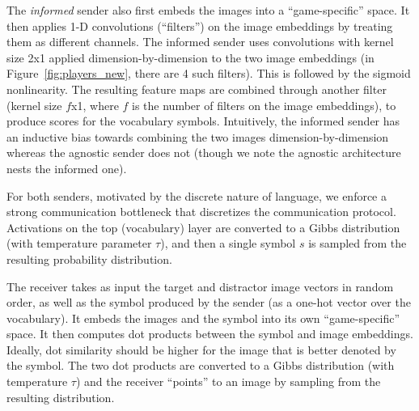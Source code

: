 The \emph{informed} sender also first embeds
the images into a ``game-specific'' space. It then applies 1-D
convolutions (``filters'') on the image embeddings by treating them as
different channels. The informed sender uses convolutions with 
kernel size 2x1
applied dimension-by-dimension to the two image embeddings (in
Figure~\ref{fig:players_new}, there are 4 such filters). This is followed
by the sigmoid nonlinearity. The resulting feature maps are combined through
another filter (kernel size $f$x1, where $f$ is the number of filters
on the image embeddings), to produce scores for the vocabulary
symbols.  Intuitively, the informed sender has an inductive bias towards combining the two images dimension-by-dimension whereas the agnostic sender does not (though we note the agnostic architecture nests the informed one).

For both senders, motivated by the
discrete nature of language, we enforce a strong communication
bottleneck that discretizes the communication protocol. Activations on
the top (vocabulary) layer
are converted to a Gibbs distribution 
(with temperature parameter $\tau$), and then a
single symbol $s$ is sampled from the resulting probability
distribution.

The receiver takes as input the target and distractor image vectors in
random order, as well as the symbol produced by the sender (as a one-hot
vector over the vocabulary).  It embeds the images and
the symbol into its own ``game-specific'' space. It then computes dot
products between the symbol and image embeddings. Ideally, dot similarity should be higher for the image that is better denoted by the symbol. %
The two dot products are %
converted to a  Gibbs distribution 
 (with temperature $\tau$) and the
receiver ``points'' to an image by sampling from the resulting
distribution.



